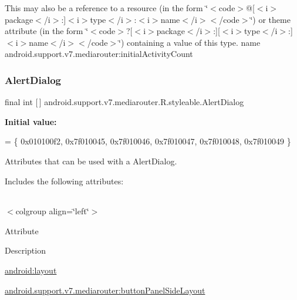 This may also be a reference to a resource (in the form \char`\"{}$<$code$>$@\mbox{[}$<$i$>$package$<$/i$>$\+:\mbox{]}$<$i$>$type$<$/i$>$\+:$<$i$>$name$<$/i$>$$<$/code$>$\char`\"{}) or theme attribute (in the form \char`\"{}$<$code$>$?\mbox{[}$<$i$>$package$<$/i$>$\+:\mbox{]}\mbox{[}$<$i$>$type$<$/i$>$\+:\mbox{]}$<$i$>$name$<$/i$>$$<$/code$>$\char`\"{}) containing a value of this type.  name android.\+support.\+v7.\+mediarouter\+:initial\+Activity\+Count \mbox{\label{classandroid_1_1support_1_1v7_1_1mediarouter_1_1R_1_1styleable_a2c8307beccb0eb2a93adf87cab8ef939}} 
\subsubsection{\texorpdfstring{Alert\+Dialog}{AlertDialog}}
{\footnotesize\ttfamily final int \mbox{[}$\,$\mbox{]} android.\+support.\+v7.\+mediarouter.\+R.\+styleable.\+Alert\+Dialog\hspace{0.3cm}{\ttfamily [static]}}

{\bfseries Initial value\+:}
\begin{DoxyCode}
= \{
            0x010100f2, 0x7f010045, 0x7f010046, 0x7f010047,
            0x7f010048, 0x7f010049
        \}
\end{DoxyCode}
Attributes that can be used with a Alert\+Dialog. 

Includes the following attributes\+:

\tabulinesep=1mm
\begin{longtabu} spread 0pt [c]{*{0}{|X[-1]}|}
\hline
\end{longtabu}
$<$colgroup align=\char`\"{}left\char`\"{}$>$ 

Attribute

Description 

{\ttfamily \hyperlink{classandroid_1_1support_1_1v7_1_1mediarouter_1_1R_1_1styleable_a7fd72f79655c91f3af5eb5cb8f62fcef}{android\+:layout}}

{\ttfamily \hyperlink{classandroid_1_1support_1_1v7_1_1mediarouter_1_1R_1_1styleable_ac63bd50a2885305595427ff4a1a5ee17}{android.\+support.\+v7.\+mediarouter\+:button\+Panel\+Side\+Layout}}

